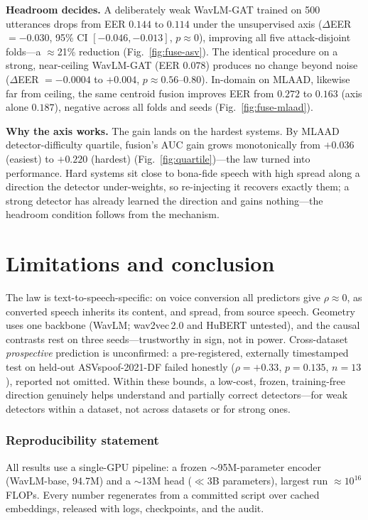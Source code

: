 \documentclass{article}
\begin{document}
\textbf{Headroom decides.} A deliberately weak WavLM-GAT trained on 500 utterances
drops from EER $0.144$ to $0.114$ under the unsupervised axis ($\Delta$EER
$=-0.030$, 95\% CI $[-0.046,-0.013]$, $p\approx0$), improving all five
attack-disjoint folds---a $\approx$21\% reduction (Fig.~\ref{fig:fuse-asv}). The
identical procedure on a strong, near-ceiling WavLM-GAT (EER $0.078$) produces no
change beyond noise ($\Delta$EER $=-0.0004$ to $+0.004$, $p\approx0.56$--$0.80$).
In-domain on MLAAD, likewise far from ceiling, the same centroid fusion improves
EER from $0.272$ to $0.163$ (axis alone $0.187$), negative across all folds and
seeds (Fig.~\ref{fig:fuse-mlaad}).

\textbf{Why the axis works.} The gain lands on the hardest systems. By MLAAD
detector-difficulty quartile, fusion's AUC gain grows monotonically from $+0.036$
(easiest) to $+0.220$ (hardest) (Fig.~\ref{fig:quartile})---the law turned into
performance. Hard systems sit close to bona-fide speech with high spread along a
direction the detector under-weights, so re-injecting it recovers exactly them; a
strong detector has already learned the direction and gains nothing---the headroom
condition follows from the mechanism.

\section{Limitations and conclusion}
The law is text-to-speech-specific: on voice conversion all predictors give
$\rho\approx0$, as converted speech inherits its content, and spread, from source
speech. Geometry uses one backbone (WavLM; wav2vec\,2.0 \citep{baevski2020wav2vec}
and HuBERT \citep{hsu2021hubert} untested), and the causal contrasts rest on three
seeds---trustworthy in sign, not in power. Cross-dataset \emph{prospective}
prediction is unconfirmed: a pre-registered, externally timestamped test on
held-out ASVspoof-2021-DF failed honestly ($\rho=+0.33$, $p=0.135$, $n=13$),
reported not omitted. Within these bounds, a low-cost, frozen, training-free
direction genuinely helps understand and partially correct detectors---for weak
detectors within a dataset, not across datasets or for strong ones.

\subsubsection*{Reproducibility statement}
All results use a single-GPU pipeline: a frozen $\sim$95M-parameter encoder
(WavLM-base, 94.7M) and a $\sim$13M head ($\ll 3$B parameters), largest run
$\approx 10^{16}$ FLOPs. Every number regenerates from a committed script over
cached embeddings, released with logs, checkpoints, and the audit.



\end{document}
